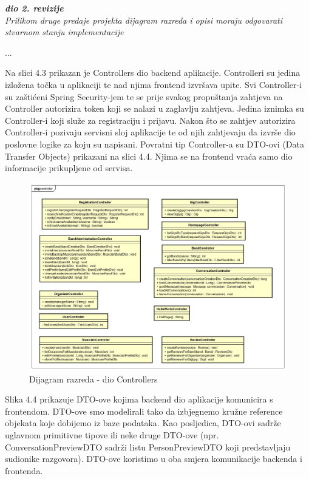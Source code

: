 			\textbf{\textit{dio 2. revizije}}\\			
			
			\textit{Prilikom druge predaje projekta dijagram razreda i opisi moraju odgovarati stvarnom stanju implementacije}
			
			... 
			
			
			Na slici 4.3 prikazan je Controllers dio backend aplikacije. Controlleri su jedina izložena točka u aplikaciji te nad njima frontend izvršava upite. Svi Controller-i su zaštićeni Spring Security-jem te se prije svakog propuštanja zahtjeva na Controller autorizira token koji se nalazi u zaglavlju zahtjeva. Jedina iznimka su Controller-i koji služe za registraciju i prijavu. Nakon što se zahtjev autorizira Controller-i pozivaju servisni sloj aplikacije te od njih zahtjevaju da izvrše dio poslovne logike za koju su napisani. Povratni tip Controller-a su DTO-ovi (Data Transfer Objects) prikazani na slici 4.4. Njima se na frontend vraća samo dio informacije prikupljene od servisa.  
			
			\eject
			
			\begin{figure}[H]
				\begin{center}
					\includegraphics[width=17cm]{slike/kontroleri.PNG}
				\end{center}
				\caption{Dijagram razreda - dio Controllers}
				\label{fig:kontroleri}
			\end{figure}
		
			Slika 4.4 prikazuje DTO-ove kojima backend dio aplikacije komunicira s frontendom. DTO-ove smo modelirali tako da izbjegnemo kružne reference objekata koje dobijemo iz baze podataka. Kao posljedica, DTO-ovi sadrže uglavnom primitivne tipove ili neke druge DTO-ove (npr. ConversationPreviewDTO sadrži listu PersonPreviewDTO koji predstavljaju sudionike razgovora). DTO-ove koristimo u oba smjera komunikacije backenda i frontenda.
			
